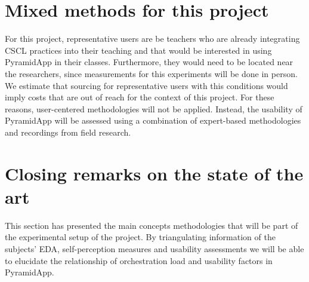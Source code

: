 \section {Mixed methods for this project}
For this project, representative users are be teachers who are already integrating CSCL practices into their teaching and that would be interested in using PyramidApp in their classes. Furthermore, they would need to be located near the researchers, since measurements for this experiments will be done in person. We estimate that sourcing for representative users with this conditions would imply costs that are out of reach for the context of this project. For these reasons, user-centered methodologies will not be applied. Instead, the usability of PyramidApp will be assessed using a combination of expert-based methodologies and recordings from field research.
\section{Closing remarks on the state of the art}
This section has presented the main concepts methodologies that will be part of the experimental setup of the project. By triangulating information of the subjects' EDA, self-perception measures and usability assessments we will be able to elucidate the relationship of orchestration load and usability factors in PyramidApp.



\newpage


